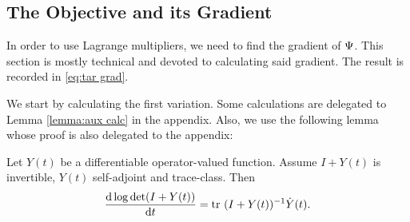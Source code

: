 \documentclass{amsart}
\numberwithin{equation}{section}
\begin{document}
\subsection{The Objective and its Gradient}\label{section:objective}
In order to use Lagrange multipliers, we need to find the gradient of
$\Psi$. This section is mostly technical and devoted to calculating
said gradient. The result is recorded in \eqref{eq:tar grad}.

We start by calculating the first variation. Some calculations are
delegated to Lemma \ref{lemma:aux calc} in the appendix. Also, we
use the following lemma whose proof is also delegated to the appendix:
\begin{lemma}\label{lemma:lax}
  Let $Y(t)$ be a differentiable operator-valued function. Assume 
  $I+Y(t)$ is invertible, $Y(t)$ self-adjoint and trace-class. Then
  \begin{equation*}
    \frac{\text{\textup{d}} \log \det (I+Y(t))}{\text{\textup{d}} t} = \textup{tr}\  (I+Y(t))^{-1} \dot{Y}(t).
  \end{equation*}
\end{lemma}
\end{document}
